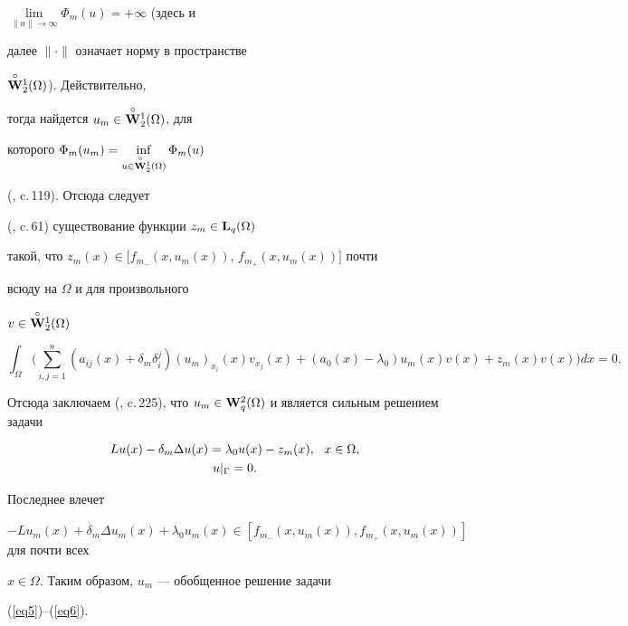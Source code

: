 \begin{pf}
$\lim\limits_{\|u\|\to\infty}\Phi_m(u)=+\infty$ (здесь и


далее $\|\cdot\|$ означает норму в пространстве


$\overset{\circ}{\bold W}{}_2^1(\Omega)$). Действительно,


тогда найдется $u_m\in \overset{\circ}{\bold W}{}_2^1 (\Omega)$, для


которого $\Phi_m(u_m)=


\inf\limits_{u\in\overset{\circ}{\bold W}{}_2^1(\Omega)}\Phi_m(u)$


(\cite{Vai}, c.\,119). Отсюда следует


(\cite{Pav7}, c.\,61) существование функции $z_m\in {\bold L}_q(\Omega)$


такой, что $z_m(x)\in [f_{m_-}(x,u_m(x))$, $f_{m_+}(x,u_m(x))]$ почти


всюду на $\Omega$ и для  произвольного


$v\in \overset{\circ}{\bold W}{}_2^1(\Omega)$


$$


\int_{\Omega}\bigg(\sum_{i,j=1}^{n}(a_{ij}(x)+


\delta_m\delta_i^j)(u_m)_{x_i}(x)v_{x_j}(x)+


(a_0(x)-\lambda_0)u_m(x)v(x)+z_m(x)v(x)\bigg)dx=0.


$$


Отсюда заключаем (\cite{Gil}, c.\,225), что $u_m\in{\bold


W}_q^2(\Omega)$ и является сильным решением задачи


\begin{gather}\label{eq7}


Lu(x)-\delta_m\Delta u(x)=\lambda_0u(x)-z_m(x),\ \ x\in\Omega,\\


%




u |_{\Gamma}=0.\notag


\end{gather}


Последнее влечет


$-Lu_m(x)+\delta_m\Delta u_m(x)+\lambda_0u_m(x)\in


[f_{m_-}(x,u_m(x)),f_{m_+}(x,u_m(x))]$ для почти всех


$x\in\Omega$. Таким образом, $u_m$ --- обобщенное решение задачи


(\ref{eq5})--(\ref{eq6}).






\end{pf}
